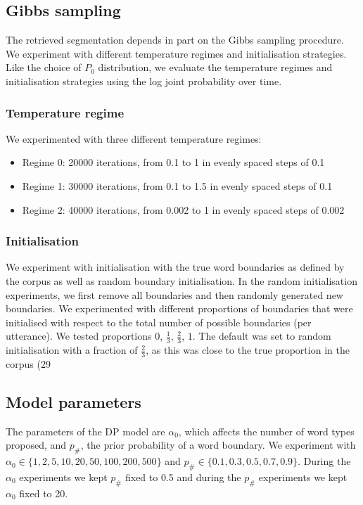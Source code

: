 \subsection{Gibbs sampling}

The retrieved segmentation depends in part on the Gibbs sampling procedure. We experiment with different temperature regimes and initialisation strategies. Like the choice of $P_0$ distribution, we evaluate the temperature regimes and initialisation strategies using the log joint probability over time.

\subsubsection{Temperature regime}

We experimented with three different temperature regimes:

\begin{itemize}
\item Regime 0: 20000 iterations, from 0.1 to 1 in evenly spaced steps of 0.1
\item Regime 1: 30000 iterations, from 0.1 to 1.5 in evenly spaced steps of 0.1
\item Regime 2: 40000 iterations, from 0.002 to 1 in evenly spaced steps of 0.002
\end{itemize}

\subsubsection{Initialisation}

We experiment with initialisation with the true word boundaries as defined by the corpus as well as random boundary initialisation. In the random initialisation experiments, we first remove all boundaries and then randomly generated new boundaries. We experimented with different proportions of boundaries that were initialised with respect to the total number of possible boundaries (per utterance). We tested proportions $0$, $\frac{1}{3}$, $\frac{2}{3}$, $1$. The default was set to random initialisation with a fraction of $\frac{2}{3}$, as this was close to the true proportion in the corpus (29%

\subsection{Model parameters}

The parameters of the DP model are $\alpha_0$, which affects the number of word types proposed, and $p_\#$, the prior probability of a word boundary. We experiment with $\alpha_0 \in \{1, 2, 5, 10, 20, 50, 100, 200, 500\}$ and $p_\# \in \{0.1, 0.3, 0.5, 0.7, 0.9\}$. During the $\alpha_0$ experiments we kept $p_\#$ fixed to 0.5 and during the $p_\#$ experiments we kept $\alpha_0$ fixed to 20.

